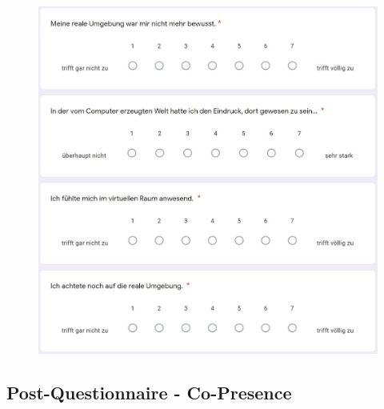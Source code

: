 \documentclass[a4paper,11pt]{article}%
\renewcommand{\\}{\vspace*{0.5\baselineskip} \newline}
\begin{document}
{{	\begin{figure}[H]
	\centering
		\begin{footnotesize}
			\includegraphics[scale=0.6]{Abbildungen/Fragebogen/Post-Questionnaire/PQP3}
		\end{footnotesize}
	\end{figure}	

\newpage
\subsection{Post-Questionnaire - Co-Presence}			
\label{Post-Questionnaire - Co-Presence}		

}}
\end{document}
